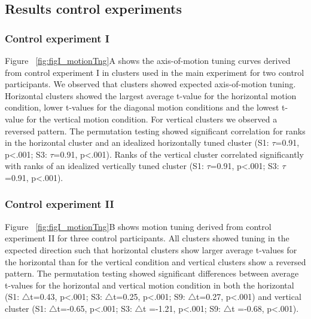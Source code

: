 \subsection{Results control experiments}
\subsubsection{Control experiment I}
Figure ~\ref{fig:figI_motionTng}A shows the axis-of-motion tuning curves derived from control experiment I in clusters used in the main experiment for two control participants. We observed that clusters showed expected axis-of-motion tuning. Horizontal clusters showed the largest average t-value for the horizontal motion condition, lower t-values for the diagonal motion conditions and the lowest t-value for the vertical motion condition. For vertical clusters we observed a reversed pattern. The permutation testing showed significant correlation for ranks in the horizontal cluster and an idealized horizontally tuned cluster (S1: $\tau$=0.91, p\textless.001; S3: $\tau$=0.91, p\textless.001). Ranks of the vertical cluster correlated significantly with ranks of an idealized vertically tuned cluster (S1: $\tau$=0.91, p\textless.001; S3: $\tau$=0.91, p\textless.001).

\subsubsection{Control experiment II}
Figure ~\ref{fig:figI_motionTng}B shows motion tuning derived from control experiment II for three control participants. All clusters showed tuning in the expected direction such that horizontal clusters show larger average t-values for the horizontal than for the vertical condition and vertical clusters show a reversed pattern. The permutation testing showed significant differences between average t-values for the horizontal and vertical motion condition in both the horizontal (S1: $\bigtriangleup$t=0.43, p\textless.001; S3: $\bigtriangleup$t=0.25, p\textless.001; S9: $\bigtriangleup$t=0.27, p\textless.001) and vertical cluster (S1: $\bigtriangleup$t=-0.65, p\textless.001; S3: $\bigtriangleup$t =-1.21, p\textless.001; S9: $\bigtriangleup$t =-0.68, p\textless.001).

